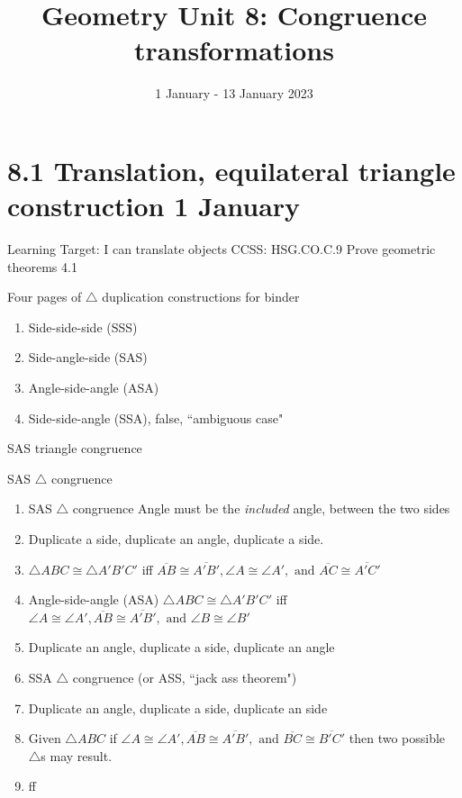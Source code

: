 

\title{Geometry Unit 8: Congruence transformations}
\date{1 January - 13 January 2023}


\frame{\titlepage}

\section[Outline]{}
\frame{\tableofcontents}


\section{8.1 Translation, equilateral triangle construction \hfill 1 January}
\begin{frame}{Learning Target: I can translate objects}
{CCSS: HSG.CO.C.9 Prove geometric theorems \hfill \alert{4.1}}
  \begin{block}{Four pages of $\triangle$ duplication constructions for binder}
    \begin{enumerate}
        \item Side-side-side (SSS)
        \item Side-angle-side (SAS)
        \item Angle-side-angle (ASA)
        \item Side-side-angle (SSA), false, ``ambiguous case"
    \end{enumerate}
  \end{block}
\end{frame}

\begin{frame}{SAS triangle congruence}
  \begin{block}{SAS $\triangle$ congruence}
    \begin{enumerate}
        \item SAS $\triangle$ congruence Angle must be the \emph{included} angle, between the two sides
        \item Duplicate a side, duplicate an angle, duplicate a side.
        \item $\triangle ABC \cong \triangle A'B'C'$ iff $\overline{AB} \cong \overline{A'B'}, \angle A \cong \angle A', \text{ and } \overline{AC} \cong \overline{A'C'}$
        \item Angle-side-angle (ASA) $\triangle ABC \cong \triangle A'B'C'$ iff $\angle A \cong \angle A', \overline{AB} \cong \overline{A'B'}, \text{ and } \angle B \cong \angle B'$
        \item Duplicate an angle, duplicate a side, duplicate an angle
         \item SSA $\triangle$ congruence (or ASS, ``jack ass theorem")
        \item Duplicate an angle, duplicate a side, duplicate an side
        \item Given $\triangle ABC$ if $ \angle A \cong \angle A', \overline{AB} \cong \overline{A'B'}, \text{ and } \overline{BC} \cong \overline{B'C'}$ then two possible $\triangle$s may result.
         \item  ff
      \end{enumerate}
    \end{block}
\end{frame}

